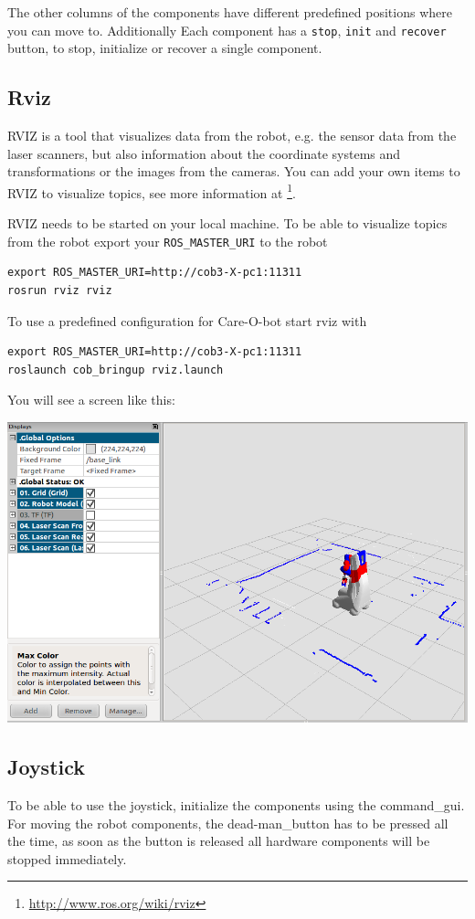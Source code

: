 The other columns of the components have different predefined positions where you can move to. Additionally Each component has a \texttt{stop}, \texttt{init} and \texttt{recover} button, to stop, initialize or recover a single component.

\subsection{Rviz}
RVIZ is a tool that visualizes data from the robot, e.g. the sensor data from the laser scanners, but also information about the coordinate systems and transformations or the images from the cameras. You can add your own items to RVIZ to visualize topics, see more information at \footnote{\url{http://www.ros.org/wiki/rviz}}.

RVIZ needs to be started on your local machine. To be able to visualize topics from the robot export your \texttt{ROS\_MASTER\_URI} to the robot
\begin{lstlisting}
export ROS_MASTER_URI=http://cob3-X-pc1:11311
rosrun rviz rviz
\end{lstlisting}

To use a predefined configuration for Care-O-bot start rviz with
\begin{lstlisting}
export ROS_MASTER_URI=http://cob3-X-pc1:11311
roslaunch cob_bringup rviz.launch
\end{lstlisting}

You will see a screen like this:
\begin {center}
\includegraphics[width=1\textwidth]{images/rviz.png}
\end{center}

\subsection{Joystick}
To be able to use the joystick, initialize the components using the command\_gui. For moving the robot components, the dead-man\_button has to be pressed all the time, as soon as the button is released all hardware components will be stopped immediately. 

